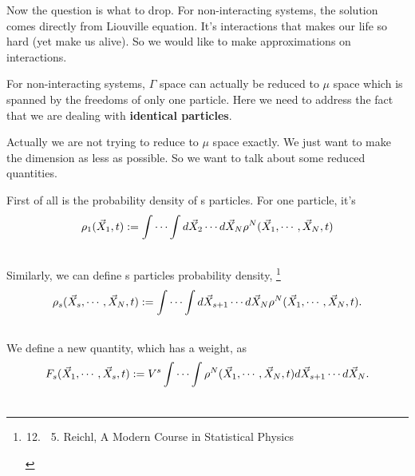 \documentclass[letterpaper,10pt,english]{sphinxmanual}
\begin{document}
Now the question is what to drop. For non-interacting systems, the solution comes directly from Liouville equation. It's interactions that makes our life so hard (yet make us alive). So we would like to make approximations on interactions.

For non-interacting systems, $\Gamma$ space can actually be reduced to $\mu$ space which is spanned by the freedoms of only one particle. Here we need to address the fact that we are dealing with \textbf{identical particles}.

Actually we are not trying to reduce to $\mu$ space exactly. We just want to make the dimension as less as possible. So we want to talk about some reduced quantities.

First of all is the probability density of s particles. For one particle, it's
\begin{gather}
\begin{split}\rho_1(\vec X_1, t) := \int \cdots\int d\vec X_2 \cdots d \vec X_N \rho^N(\vec X_1, \cdots, \vec X_N, t)\end{split}\notag\\\begin{split}\end{split}\notag
\end{gather}
Similarly, we can define s particles probability density, \footnote{\begin{enumerate}
\setcounter{enumi}{11}
\item {} \begin{enumerate}
\setcounter{enumi}{4}
\item {} 
Reichl, A Modern Course in Statistical Physics

\end{enumerate}

\end{enumerate}
}
\begin{gather}
\begin{split}\rho_s(\vec X_s, \cdots, \vec X_N, t) := \int \cdots \int d \vec X_{s+1}\cdots d\vec X_N \rho^N(\vec X_1, \cdots, \vec X_N, t) .\end{split}\notag\\\begin{split}\end{split}\notag
\end{gather}
We define a new quantity, which has a weight, as
\begin{gather}
\begin{split}F_s(\vec X_1, \cdots,\vec X_s,t) := V^s \int\cdots \int \rho^N(\vec X_1, \cdots, \vec X_N, t) d\vec X_{s+1}\cdots d\vec X_N   .\end{split}\notag\\\begin{split}\end{split}\notag
\end{gather}
\end{document}
